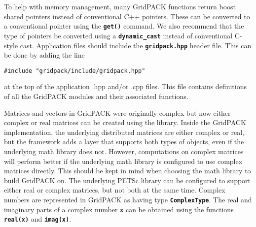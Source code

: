 To help with memory management, many GridPACK functions return boost shared pointers instead of conventional C++ pointers. These can be converted to a conventional pointer using the \texttt{\textbf{get()}} command. We also recommend that the type of pointers be converted using a \texttt{\textbf{dynamic\_cast}} instead of conventional C-style cast.
Application files should include the \texttt{\textbf{gridpack.hpp}} header file. This can be done by adding the line

{
\color{red}
\begin{Verbatim}[fontseries=b]
    #include "gridpack/include/gridpack.hpp"
\end{Verbatim}
}

at the top of the application .hpp and/or .cpp files. This file contains definitions of all the GridPACK modules and their associated functions.

Matrices and vectors in GridPACK were originally complex but now either complex
or real matrices can be created using the library. Inside the GridPACK
implementation, the underlying distributed matrices are either complex or real,
but the framework adds a layer that supports both types of objects, even if the
underlying math library does not. However, computations on complex matrices will
perform better if the underlying math library is configured to use complex
matrices directly. This should be kept in mind when choosing the math library to
build GridPACK on. The underlying PETSc library can be configured to support
either real or complex matrices, but not both at the same time. Complex numbers are represented in GridPACK as having type \texttt{\textbf{ComplexType}}. The real and imaginary parts of a complex number \texttt{\textbf{x}} can be obtained using the functions \texttt{\textbf{real(x)}} and \texttt{\textbf{imag(x)}}.
